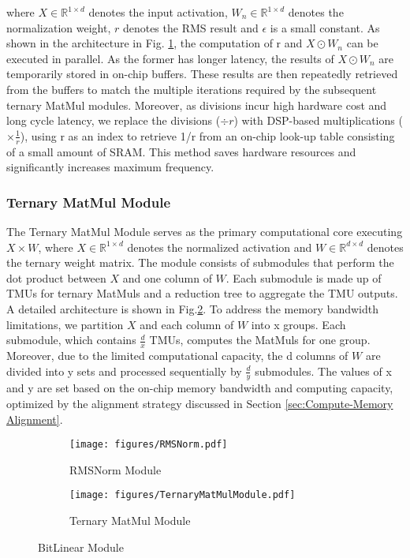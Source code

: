 where $X\in\mathbb{R}^{1 \times d}$ denotes the input activation, $W_n\in\mathbb{R}^{1 \times d}$ denotes the normalization weight, $r$ denotes the RMS result and $\epsilon$ is a small constant. As shown in the architecture in Fig. \ref{fig:RMSNorm}, the computation of r and $X\odot W_n$ can be executed in parallel. As the former has longer latency, the results of $X\odot W_n$ are temporarily stored in on-chip buffers. These results are then repeatedly retrieved from the buffers to match the multiple iterations required by the subsequent ternary MatMul modules. Moreover, as divisions incur high hardware cost and long cycle latency, we replace the divisions ($\div r$) with DSP-based multiplications ($\times \frac{1}{r}$), using r as an index to retrieve 1/r from an on-chip look-up table consisting of a small amount of SRAM. This method saves hardware resources and significantly increases maximum frequency.

\subsubsection{Ternary MatMul Module}
The Ternary MatMul Module serves as the primary computational core executing $X\times W$, where $X\in\mathbb{R}^{1 \times d}$ denotes the normalized activation and $W\in\mathbb{R}^{d \times d}$ denotes the ternary weight matrix. The module consists of submodules that perform the dot product between $X$ and one column of $W$. Each submodule is made up of TMUs for ternary MatMuls and a reduction tree to aggregate the TMU outputs. A detailed architecture is shown in Fig.\ref{fig:TMM}. To address the memory bandwidth limitations, we partition $X$ and each column of $W$ into x groups. Each submodule, which contains $\frac{d}{x}$ TMUs, computes the MatMuls for one group. Moreover, due to the limited computational capacity, the d columns of $W$ are divided into y sets and processed sequentially by $\frac{d}{y}$ submodules. The values of x and y are set based on the on-chip memory bandwidth and computing capacity, optimized by the alignment strategy discussed in Section \ref{sec:Compute-Memory Alignment}.


\begin{figure}[h]
    \vspace{-5mm}
    \centering
    \begin{subfigure}[b]{0.4\textwidth} 
        \centering
        \texttt{[image: figures/RMSNorm.pdf]} 
        \caption{RMSNorm Module}
        \label{fig:RMSNorm}
    \end{subfigure} 
    \begin{subfigure}[b]{0.4\textwidth} 
        \centering
        \texttt{[image: figures/TernaryMatMulModule.pdf]}  
        \caption{Ternary MatMul Module}
        \label{fig:TMM}
    \end{subfigure}
    \vspace{-2mm}
    \caption{BitLinear Module}
    \label{fig:bitlinear module}
    \vspace{-6mm}
\end{figure}


